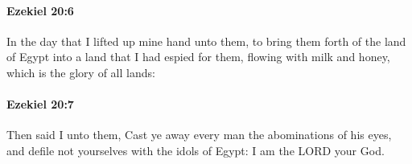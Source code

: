 		\paragraph{Ezekiel 20:6} %
			\label{EZEKIEL-20-6}

			In the day that I lifted up mine hand unto them, to bring them forth of the land of Egypt into a land that I had espied for them, flowing with milk and honey, which is the glory of all lands:


		\paragraph{Ezekiel 20:7} %
			\label{EZEKIEL-20-7}

			Then said I unto them, Cast ye away every man the abominations of his eyes, and defile not yourselves with the idols of Egypt: I am the LORD your God.


